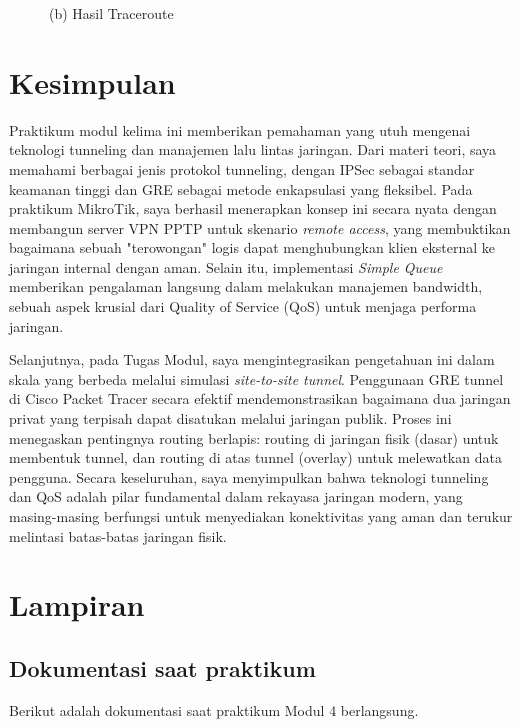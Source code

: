 \begin{enumerate}
\begin{figure}[H]
\begin{minipage}{0.48\textwidth}
            \caption*{(b) Hasil Traceroute}
        \end{minipage}
    \end{figure}
\end{enumerate}

\section{Kesimpulan}

Praktikum modul kelima ini memberikan pemahaman yang utuh mengenai teknologi tunneling dan manajemen lalu lintas jaringan. Dari materi teori, saya memahami berbagai jenis protokol tunneling, dengan IPSec sebagai standar keamanan tinggi dan GRE sebagai metode enkapsulasi yang fleksibel. Pada praktikum MikroTik, saya berhasil menerapkan konsep ini secara nyata dengan membangun server VPN PPTP untuk skenario \textit{remote access}, yang membuktikan bagaimana sebuah "terowongan" logis dapat menghubungkan klien eksternal ke jaringan internal dengan aman. Selain itu, implementasi \textit{Simple Queue} memberikan pengalaman langsung dalam melakukan manajemen bandwidth, sebuah aspek krusial dari Quality of Service (QoS) untuk menjaga performa jaringan.

Selanjutnya, pada Tugas Modul, saya mengintegrasikan pengetahuan ini dalam skala yang berbeda melalui simulasi \textit{site-to-site tunnel}. Penggunaan GRE tunnel di Cisco Packet Tracer secara efektif mendemonstrasikan bagaimana dua jaringan privat yang terpisah dapat disatukan melalui jaringan publik. Proses ini menegaskan pentingnya routing berlapis: routing di jaringan fisik (dasar) untuk membentuk tunnel, dan routing di atas tunnel (overlay) untuk melewatkan data pengguna. Secara keseluruhan, saya menyimpulkan bahwa teknologi tunneling dan QoS adalah pilar fundamental dalam rekayasa jaringan modern, yang masing-masing berfungsi untuk menyediakan konektivitas yang aman dan terukur melintasi batas-batas jaringan fisik.

\section{Lampiran}
\subsection*{Dokumentasi saat praktikum}
Berikut adalah dokumentasi saat praktikum Modul 4 berlangsung.

